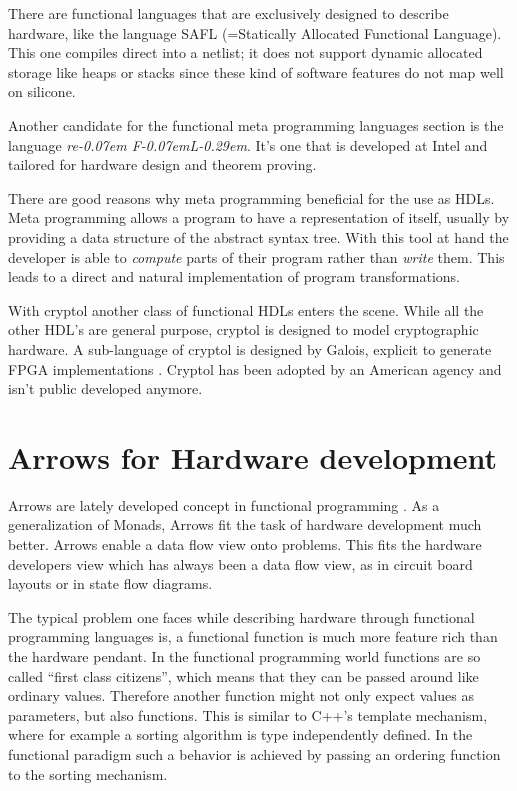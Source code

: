 \documentclass[a4paper]{llncs}
\newcommand{\reFLect}{\textit{re\kern-0.07em F\kern-0.07emL\kern-0.29em\raisebox{0.56ex}{ect}}}
\begin{document}
\par
There are functional languages that are exclusively designed to describe hardware, like the language SAFL (=Statically Allocated
Functional Language)\cite{sharp,sharp:flash,sharp:codesign}. This one compiles direct into a netlist; it does not support dynamic
allocated storage like heaps or stacks since these kind of software features do not map well on silicone.

\par
Another candidate for the functional meta programming languages section is the language \reFLect \cite{reflect}. It's one that is
developed at Intel and tailored for hardware design and theorem proving.

\par
There are good reasons why meta programming beneficial for the use as HDLs. Meta programming allows a program to have a
representation of itself, usually by providing a data structure of the abstract syntax tree. With this tool at hand the developer
is able to \emph{compute} parts of their program rather than \emph{write} them. This leads to a direct and natural implementation
of program transformations.

\par
With cryptol\cite{cryptol:programming} another class of functional HDLs enters the scene. While all the other HDL's are general
purpose, cryptol is designed to model cryptographic hardware. A sub-language of cryptol is designed by Galois, explicit to
generate FPGA implementations \cite{cryptol:fpga}. Cryptol has been adopted by an American agency and isn't public developed
anymore.


\section{Arrows for Hardware development}
Arrows are lately developed concept in functional programming \cite{Hughes98generalisingmonads}. As a generalization of Monads,
Arrows fit the task of hardware development much better. Arrows enable a data flow view onto problems. This fits the hardware
developers view which has always been a data flow view, as in circuit board layouts or in state flow diagrams.

\par
The typical problem one faces while describing hardware through functional programming languages is, a functional function is much
more feature rich than the hardware pendant. In the functional programming world functions are so called ``first class citizens'',
which means that they can be passed around like ordinary values. Therefore another function might not only expect values as
parameters, but also functions. This is similar to C++'s template mechanism, where for example a sorting algorithm is type
independently defined. In the functional paradigm such a behavior is achieved by passing an ordering function to the sorting
mechanism. 
\end{document}
